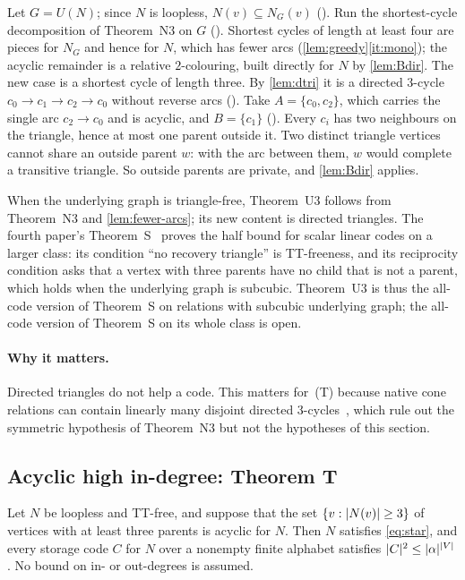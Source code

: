 \begin{outline}
Let $G=U(N)$; since $N$ is loopless, $N(v)\subseteq N_G(v)$ (). Run the shortest-cycle decomposition
of Theorem~N3 on $G$ (). Shortest cycles of length at least four are pieces for $N_G$ and hence
for $N$, which has fewer arcs (\cref{lem:greedy}\ref{it:mono}); the acyclic remainder is a relative $2$-colouring, built
directly for $N$ by \cref{lem:Bdir}. The new case is a shortest
cycle of length three. By \cref{lem:dtri} it is a directed $3$-cycle $c_0\to c_1\to c_2\to c_0$ without reverse arcs
(). Take $A=\{c_0,c_2\}$, which carries the single arc $c_2\to c_0$ and is acyclic, and $B=\{c_1\}$
(). Every $c_i$ has two neighbours on the triangle, hence at most one parent outside it. Two distinct
triangle vertices cannot share an outside parent $w$: with the arc between them, $w$ would complete a transitive
triangle. So outside parents are private, and \cref{lem:Bdir} applies.
\end{outline}

When the underlying graph is triangle-free, Theorem~U3 follows from Theorem~N3 and \cref{lem:fewer-arcs}; its new
content is directed triangles. The fourth paper's Theorem~S~\cite[Theorem~6.13]{FourthPaper2026} proves the half bound
for scalar linear codes on a larger class: its condition ``no recovery triangle'' is TT-freeness, and its reciprocity
condition asks that a vertex with three parents have no child that is not a parent, which holds when the underlying
graph is subcubic. Theorem~U3 is thus the all-code version of Theorem~S on relations with subcubic underlying graph;
the all-code version of Theorem~S on its whole class is open.

\paragraph{Why it matters.} Directed triangles do not help a code. This matters for~(T) because native cone relations
can contain linearly many disjoint directed $3$-cycles~\cite[Proposition~3.10]{DirectedRecovery2026}, which rule out the
symmetric hypothesis of Theorem~N3 but not the hypotheses of this section.

\subsection{Acyclic high in-degree: Theorem T}\label{sec:T}

\begin{theorem}[Theorem T]\label{thm:T}
Let $N$ be loopless and TT-free, and suppose that the set $\{v:\lvert N(v) \rvert\ge3\}$ of vertices with at least three
parents is acyclic for $N$. Then $N$ satisfies \eqref{eq:star}, and every storage code $C$ for $N$ over a nonempty
finite alphabet satisfies $\lvert C \rvert^2\le\lvert \alpha \rvert^{\lvert V \rvert}$. No bound on in- or out-degrees is assumed.
\end{theorem}

